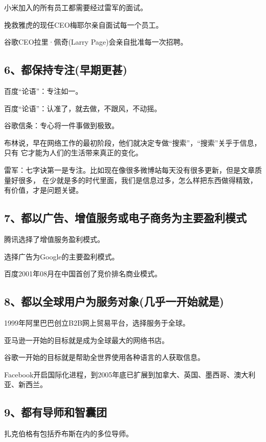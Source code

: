 \documentclass[11pt]{ctexart}
\begin{document}
{{{{小米加入的所有员工都需要经过雷军的面试。

挽救雅虎的现任CEO梅耶尔亲自面试每一个员工。

谷歌CEO拉里·佩奇(Larry Page)会亲自批准每一次招聘。

\subsection{6、都保持专注(早期更甚)}
\label{sec:org7ac9514}

百度“论语”：专注如一。

百度“论语”：认准了，就去做，不跟风，不动摇。

谷歌信条：专心将一件事做到极致。

布林说，早在网络工作的最初阶段，他们就决定专做“搜索”，“搜索”关乎于信息，只有
它才能为人们的生活带来真正的变化。

雷军：七字诀第一是专注。比如现在像很多微博站每天没有很多更新，但是文章质量好很多，
在少就是多的时代里面，我们是信息过多，怎么样把东西做得精致，有价值，才是问题关键。

\subsection{7、都以广告、增值服务或电子商务为主要盈利模式}
\label{sec:orga3775b6}

腾讯选择了增值服务盈利模式。

选择广告为Google的主要盈利模式。

百度2001年08月在中国首创了竞价排名商业模式。

\subsection{8、都以全球用户为服务对象(几乎一开始就是)}
\label{sec:org29ce4a7}

1999年阿里巴巴创立B2B网上贸易平台，选择服务于全球。

亚马逊一开始的目标就是成为全球最大的网络书店。

谷歌一开始的目标就是帮助全世界使用各种语言的人获取信息。

Facebook开启国际化进程，到2005年底已扩展到加拿大、英国、墨西哥、澳大利亚、新西兰。

\subsection{9、都有导师和智囊团}
\label{sec:org1777c5e}

扎克伯格有包括乔布斯在内的多位导师。

}}}}
\end{document}
